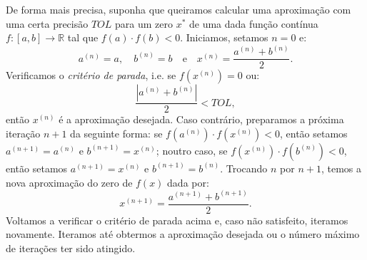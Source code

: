 De forma mais precisa, suponha que queiramos calcular uma aproximação com uma certa precisão $TOL$ para um zero $x^*$ de uma dada função contínua $f:[a, b]\to\mathbb{R}$ tal que $f(a)\cdot f(b) < 0$. Iniciamos, setamos $n=0$ e:
\begin{equation*}
  a^{(n)} = a,\quad b^{(n)} = b\quad\text{e}\quad x^{(n)} = \frac{a^{(n)} + b^{(n)}}{2}.
\end{equation*}
Verificamos o \emph{critério de parada}, i.e. se $f(x^{(n)}) = 0$ ou:
\begin{equation*}
  \displaystyle \frac{|a^{(n)}+ b^{(n)}|}{2} < TOL,
\end{equation*}
então $x^{(n)}$ é a aproximação desejada. Caso contrário, preparamos a próxima iteração $n+1$ da seguinte forma: se $f(a^{(n)})\cdot f(x^{(n)}) < 0$, então setamos $a^{(n+1)} = a^{(n)}$ e $b^{(n+1)} = x^{(n)}$; noutro caso, se $f(x^{(n)})\cdot f(b^{(n)}) < 0$, então setamos $a^{(n+1)} = x^{(n)}$ e $b^{(n+1)} = b^{(n)}$. Trocando $n$ por $n+1$, temos a nova aproximação do zero de $f(x)$ dada por:
\begin{equation*}
  x^{(n+1)} = \frac{a^{(n+1)} + b^{(n+1)}}{2}.
\end{equation*}
Voltamos a verificar o critério de parada acima e, caso não satisfeito, iteramos novamente. Iteramos até obtermos a aproximação desejada ou o número máximo de iterações ter sido atingido.

